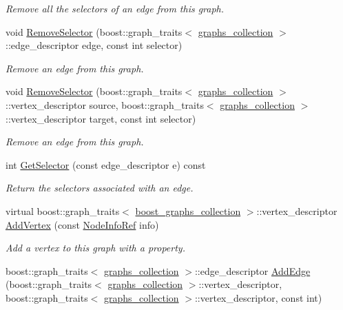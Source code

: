 \begin{DoxyCompactItemize}
\begin{DoxyCompactList}\small\item\em Remove all the selectors of an edge from this graph. \end{DoxyCompactList}\item 
void \hyperlink{structgraphs__collection_a615e587a41e5ae7c5638c0adb5f53e47}{Remove\+Selector} (boost\+::graph\+\_\+traits$<$ \hyperlink{structgraphs__collection}{graphs\+\_\+collection} $>$\+::edge\+\_\+descriptor edge, const int selector)
\begin{DoxyCompactList}\small\item\em Remove an edge from this graph. \end{DoxyCompactList}\item 
void \hyperlink{structgraphs__collection_af02a53bb6770a754273f196c949ae2e5}{Remove\+Selector} (boost\+::graph\+\_\+traits$<$ \hyperlink{structgraphs__collection}{graphs\+\_\+collection} $>$\+::vertex\+\_\+descriptor source, boost\+::graph\+\_\+traits$<$ \hyperlink{structgraphs__collection}{graphs\+\_\+collection} $>$\+::vertex\+\_\+descriptor target, const int selector)
\begin{DoxyCompactList}\small\item\em Remove an edge from this graph. \end{DoxyCompactList}\item 
int \hyperlink{structgraphs__collection_a99d8a722a7c4690f13a3a026f452c6c6}{Get\+Selector} (const edge\+\_\+descriptor e) const
\begin{DoxyCompactList}\small\item\em Return the selectors associated with an edge. \end{DoxyCompactList}\item 
virtual boost\+::graph\+\_\+traits$<$ \hyperlink{graph_8hpp_a315f0e4c95fedf30b91945ed29d42332}{boost\+\_\+graphs\+\_\+collection} $>$\+::vertex\+\_\+descriptor \hyperlink{structgraphs__collection_ad0c9e75687200d3de0cb4a7c0880042c}{Add\+Vertex} (const \hyperlink{node__info_8hpp_a345f052eed4efe04f7848fd0ebd015b2}{Node\+Info\+Ref} info)
\begin{DoxyCompactList}\small\item\em Add a vertex to this graph with a property. \end{DoxyCompactList}\item 
boost\+::graph\+\_\+traits$<$ \hyperlink{structgraphs__collection}{graphs\+\_\+collection} $>$\+::edge\+\_\+descriptor \hyperlink{structgraphs__collection_adfd3cf57d0be9bc4e768551152c85efd}{Add\+Edge} (boost\+::graph\+\_\+traits$<$ \hyperlink{structgraphs__collection}{graphs\+\_\+collection} $>$\+::vertex\+\_\+descriptor, boost\+::graph\+\_\+traits$<$ \hyperlink{structgraphs__collection}{graphs\+\_\+collection} $>$\+::vertex\+\_\+descriptor, const int)

\end{DoxyCompactItemize}
